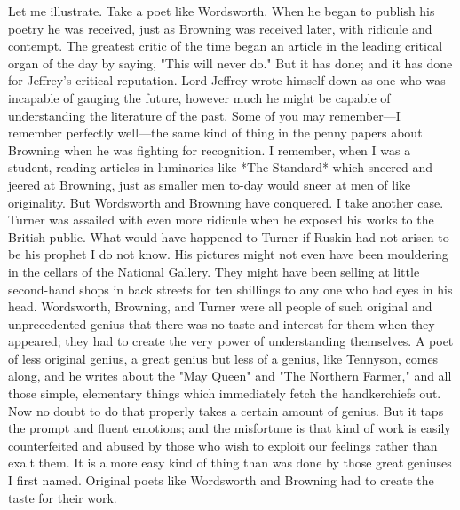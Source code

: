 \documentclass[12pt,letterpaper,oneside]{book}
\begin{document}
Let me illustrate. Take a poet like Wordsworth. 
When he began to publish his poetry 
he was received, just as Browning was received 
later, with ridicule and contempt. The greatest 
critic of the time began an article in the leading 
critical organ of the day by saying, "This will 
never do." But it has done; and it has done for 
Jeffrey's critical reputation. Lord Jeffrey wrote 
himself down as one who was incapable of 
gauging the future, however much he might 
be capable of understanding the literature of 
the past. Some of you may remember---I 
remember perfectly well---the same kind of 
thing in the penny papers about Browning 
when he was fighting for recognition. I remember, 
when I was a student, reading articles 
in luminaries like *The Standard* which sneered 
and jeered at Browning, just as smaller men to-day 
would sneer at men of like originality. But 
Wordsworth and Browning have conquered. I 
take another case. Turner was assailed with 
even more ridicule when he exposed his works 
to the British public. What would have happened 
to Turner if Ruskin had not arisen to be 
his prophet I do not know. His pictures might 
not even have been mouldering in the cellars of 
the National Gallery. They might have been 
selling at little second-hand shops in back streets 
for ten shillings to any one who had eyes in his 
head. Wordsworth, Browning, and Turner were 
all people of such original and unprecedented 
genius that there was no taste and interest for 
them when they appeared; they had to create 
the very power of understanding themselves. 
A poet of less original genius, a great genius 
but less of a genius, like Tennyson, comes along, 
and he writes about the "May Queen" and 
"The Northern Farmer," and all those simple, 
elementary things which immediately fetch the 
handkerchiefs out. Now no doubt to do that 
properly takes a certain amount of genius. But 
it taps the prompt and fluent emotions; and the 
misfortune is that kind of work is easily counterfeited 
and abused by those who wish to 
exploit our feelings rather than exalt them. 
It is a more easy kind of thing than was done 
by those great geniuses I first named. Original
poets like Wordsworth and Browning had to 
create the taste for their work. 
\end{document}
